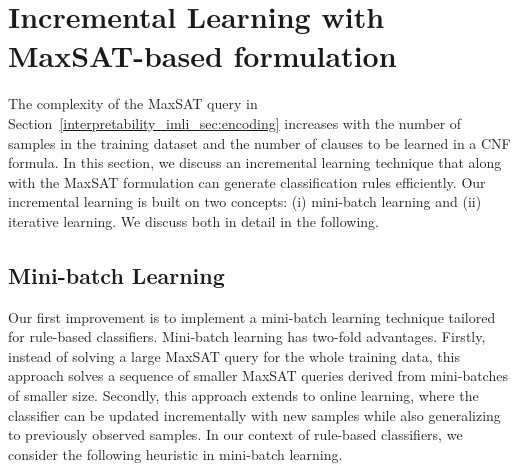 \section{Incremental Learning with MaxSAT-based formulation}
\label{interpretability_imli_sec:incremental_learning}
The complexity of the MaxSAT query in Section~\ref{interpretability_imli_sec:encoding} increases with the number of samples in the training dataset and the number of clauses to be learned in a CNF formula. In this section, we discuss an incremental learning technique that along with the MaxSAT formulation can generate classification rules efficiently. Our incremental learning is built on two concepts: (i)
mini-batch learning and (ii) iterative learning. We discuss both in detail in the following.

\subsection{Mini-batch Learning} 

Our first improvement is to implement a mini-batch learning technique tailored for rule-based classifiers. Mini-batch learning has two-fold advantages. Firstly, instead of solving a large MaxSAT query for the whole training data, this approach solves a sequence of smaller MaxSAT queries derived from mini-batches of smaller size.  Secondly, this approach extends to online learning, where the classifier can be updated incrementally with new samples while also generalizing to previously observed samples. In our context of rule-based classifiers, we consider the following heuristic in mini-batch learning.


